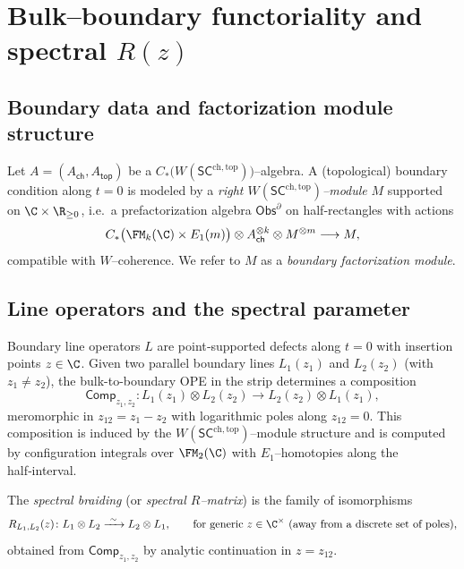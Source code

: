 \section{Bulk–boundary functoriality and spectral $R(z)$}

\subsection{Boundary data and factorization module structure}
Let $A=(A_{\mathsf{ch}},A_{\mathsf{top}})$ be a $C_\ast\!\bigl(W(\mathsf{SC}^{\mathrm{ch,top}})\bigr)$–algebra.
A (topological) boundary condition along $t=0$ is modeled by a \emph{right $W(\mathsf{SC}^{\mathrm{ch,top}})$–module} $M$ supported on $\C\times \R_{\ge 0}$, i.e.\ a prefactorization algebra $\mathsf{Obs}^{\partial}$ on half‑rectangles with actions
\[
C_\ast\bigl(\FM_k(\C)\times E_1(m)\bigr)\otimes A_{\mathsf{ch}}^{\otimes k}\otimes M^{\otimes m}\longrightarrow M,
\]
compatible with $W$–coherence. We refer to $M$ as a \emph{boundary factorization module}.

\subsection{Line operators and the spectral parameter}
Boundary line operators $L$ are point‑supported defects along $t=0$ with insertion points $z\in\C$.
Given two parallel boundary lines $L_1(z_1)$ and $L_2(z_2)$ (with $z_1\neq z_2$), the bulk-to-boundary OPE in the strip determines a composition
\[
\mathsf{Comp}_{z_1,z_2} \colon L_1(z_1)\otimes L_2(z_2) \longrightarrow L_2(z_2)\otimes L_1(z_1),
\]
meromorphic in $z_{12}=z_1-z_2$ with logarithmic poles along $z_{12}=0$.
This composition is induced by the $W(\mathsf{SC}^{\mathrm{ch,top}})$–module structure and is computed by configuration integrals over $\FM_2(\C)$ with $E_1$–homotopies along the half‑interval.

\begin{definition}
The \emph{spectral braiding} (or \emph{spectral $R$–matrix}) is the family of isomorphisms
\[
R_{L_1,L_2}(z)\colon L_1\otimes L_2 \xrightarrow{\ \sim\ } L_2\otimes L_1,
\qquad \text{for generic } z\in \C^\times \text{ (away from a discrete set of poles)},
\]
obtained from $\mathsf{Comp}_{z_1,z_2}$ by analytic continuation in $z=z_{12}$.
\end{definition}

